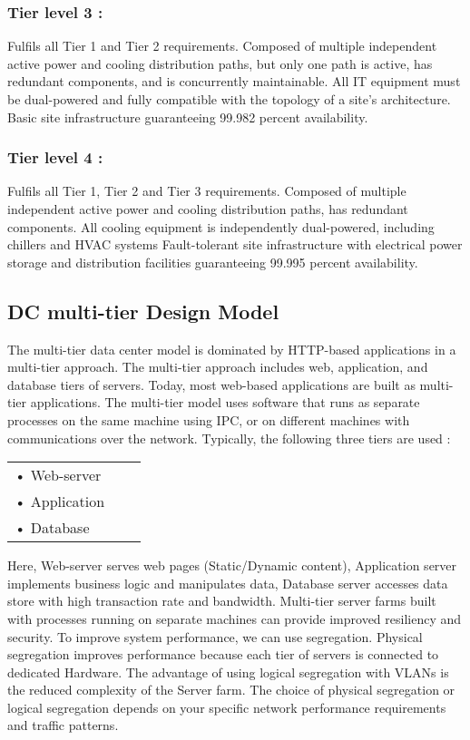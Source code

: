 \documentclass[12pt,a4paper]{report}
\begin{document}
\subsubsection{Tier level 3 :}
Fulfils all Tier 1 and Tier 2 requirements.
Composed of multiple independent active power and cooling distribution paths, but only one path is active, has redundant components, and is concurrently maintainable.
All IT equipment must be dual-powered and fully compatible with the topology of a site's architecture.
Basic site infrastructure guaranteeing 99.982 percent availability.

\subsubsection{Tier level 4 :}
Fulfils all Tier 1, Tier 2 and Tier 3 requirements.
Composed of multiple independent active power and cooling distribution paths, has redundant components.
All cooling equipment is independently dual-powered, including chillers and HVAC systems
Fault-tolerant site infrastructure with electrical power storage and distribution facilities guaranteeing 99.995 percent availability.

\subsection{DC multi-tier Design Model} 
The multi-tier data center model is dominated by HTTP-based applications in a multi-tier approach. The multi-tier approach includes web, application, and database tiers of servers. Today, most web-based applications are built as multi-tier applications. The multi-tier model uses software that runs as separate processes on the same machine using IPC, or on different machines with communications over the network. Typically, the following three tiers are used :\\
\begin{tabular}{lll}
\vspace*{0.1 in}
• Web-server &\\
\vspace*{0.1 in}
• Application  &\\
\vspace*{0.1 in}
• Database &\\
\end{tabular} 


Here, Web-server serves web pages (Static/Dynamic content), Application server implements business logic and manipulates data, Database server accesses data store with high transaction rate and bandwidth. 
Multi-tier server farms built with processes running on separate machines can provide improved resiliency and security.
To improve system performance, we can use segregation. Physical segregation improves performance because each tier of servers is connected to dedicated Hardware. The advantage of using logical segregation with VLANs is the reduced complexity of the Server farm. The choice of physical segregation or logical segregation depends on your specific network performance requirements and traffic patterns.
\end{document}
